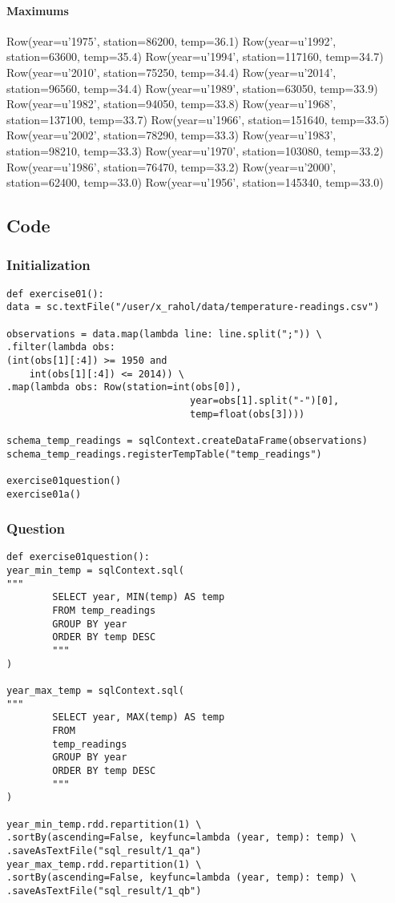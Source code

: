 \documentclass[10pt]{article}
\begin{document}
\paragraph*{Maximums}
\label{sec-1-1-2-2}
Row(year=u'1975', station=86200, temp=36.1)
Row(year=u'1992', station=63600, temp=35.4)
Row(year=u'1994', station=117160, temp=34.7)
Row(year=u'2010', station=75250, temp=34.4)
Row(year=u'2014', station=96560, temp=34.4)
Row(year=u'1989', station=63050, temp=33.9)
Row(year=u'1982', station=94050, temp=33.8)
Row(year=u'1968', station=137100, temp=33.7)
Row(year=u'1966', station=151640, temp=33.5)
Row(year=u'2002', station=78290, temp=33.3)
Row(year=u'1983', station=98210, temp=33.3)
Row(year=u'1970', station=103080, temp=33.2)
Row(year=u'1986', station=76470, temp=33.2)
Row(year=u'2000', station=62400, temp=33.0)
Row(year=u'1956', station=145340, temp=33.0)
\subsection*{Code}
\label{sec-1-2}
\subsubsection*{Initialization}
\label{sec-1-2-1}
\begin{verbatim}
def exercise01():
data = sc.textFile("/user/x_rahol/data/temperature-readings.csv")

observations = data.map(lambda line: line.split(";")) \
.filter(lambda obs:
(int(obs[1][:4]) >= 1950 and
    int(obs[1][:4]) <= 2014)) \
.map(lambda obs: Row(station=int(obs[0]),
                                year=obs[1].split("-")[0],
                                temp=float(obs[3])))

schema_temp_readings = sqlContext.createDataFrame(observations)
schema_temp_readings.registerTempTable("temp_readings")

exercise01question()
exercise01a()
\end{verbatim}
\subsubsection*{Question}
\label{sec-1-2-2}
\begin{verbatim}
def exercise01question():
year_min_temp = sqlContext.sql(
"""
        SELECT year, MIN(temp) AS temp
        FROM temp_readings
        GROUP BY year
        ORDER BY temp DESC
        """
)

year_max_temp = sqlContext.sql(
"""
        SELECT year, MAX(temp) AS temp
        FROM
        temp_readings
        GROUP BY year
        ORDER BY temp DESC
        """
)

year_min_temp.rdd.repartition(1) \
.sortBy(ascending=False, keyfunc=lambda (year, temp): temp) \
.saveAsTextFile("sql_result/1_qa")
year_max_temp.rdd.repartition(1) \
.sortBy(ascending=False, keyfunc=lambda (year, temp): temp) \
.saveAsTextFile("sql_result/1_qb")
\end{verbatim}
\end{document}
